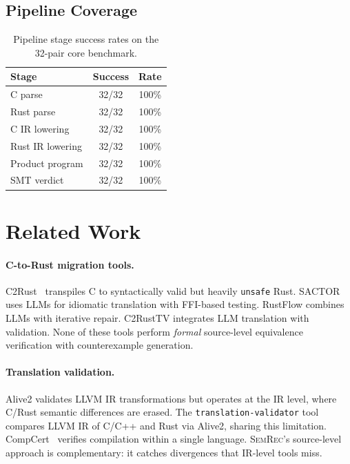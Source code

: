 \documentclass[11pt,a4paper]{article}
\begin{document}
\subsection{Pipeline Coverage}\label{sec:pipeline-coverage}

\begin{table}[t]
\centering
\small
\caption{Pipeline stage success rates on the 32-pair core benchmark.}
\label{tab:pipeline}
\begin{tabular}{@{}lcc@{}}
\toprule
Stage & Success & Rate \\
\midrule
C parse & 32/32 & 100\% \\
Rust parse & 32/32 & 100\% \\
C IR lowering & 32/32 & 100\% \\
Rust IR lowering & 32/32 & 100\% \\
Product program & 32/32 & 100\% \\
SMT verdict & 32/32 & 100\% \\
\bottomrule
\end{tabular}
\end{table}


\section{Related Work}\label{sec:related}

\paragraph{C-to-Rust migration tools.}
C2Rust~\cite{c2rust2019} transpiles C to syntactically valid but heavily
\texttt{unsafe} Rust.  SACTOR uses LLMs for idiomatic translation with
FFI-based testing.  RustFlow combines LLMs with iterative repair.
C2RustTV integrates LLM translation with validation.  None of these
tools perform \emph{formal} source-level equivalence verification with
counterexample generation.

\paragraph{Translation validation.}
Alive2 validates LLVM IR transformations but operates at the IR level,
where C/Rust semantic differences are erased.
The \texttt{translation-validator} tool compares LLVM IR of C/C++ and
Rust via Alive2, sharing this limitation.
CompCert~\cite{leroy2009compcert} verifies compilation within a single
language.  \textsc{SemRec}'s source-level approach is complementary:
it catches divergences that IR-level tools miss.
\end{document}
